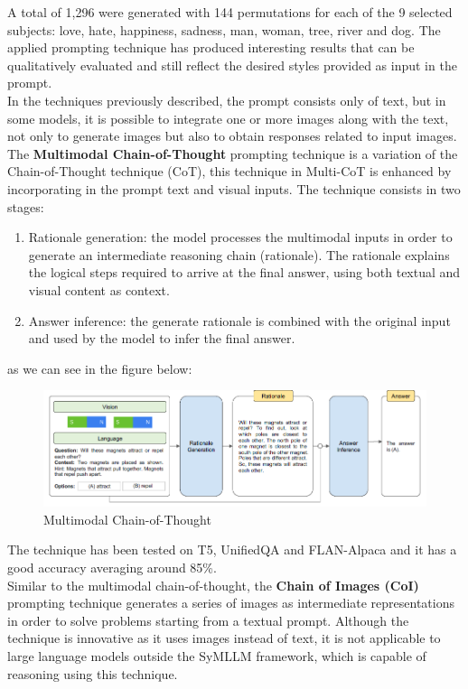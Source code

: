 A total of 1,296 were generated with 144 permutations for each of the 9 selected subjects: love, hate, happiness, sadness, man, woman, tree, river and dog. The applied prompting technique has produced interesting results that can be qualitatively evaluated and still reflect the desired styles provided as input in the prompt.\\
In the techniques previously described, the prompt consists only of text, but in some models, it is possible to integrate one or more images along with the text, not only to generate images but also to obtain responses related to input images. The \textbf{Multimodal Chain-of-Thought} prompting technique\cite{zhang2023multimodal} is a variation of the Chain-of-Thought technique (CoT), this technique in Multi-CoT is enhanced by incorporating in the prompt text and visual inputs. The technique consists in two stages:
\begin{enumerate}
    \item Rationale generation: the model processes the multimodal inputs in order to generate an intermediate reasoning chain (rationale). The rationale explains the logical steps required to arrive at the final answer, using both textual and visual content as context.

    \item Answer inference: the generate rationale is combined with the original input and used by the model to infer the final answer.
\end{enumerate}
as we can see in the figure below:
\begin{figure}[H]
    \centering
    \includegraphics[width=0.9\linewidth]{Figures/fig_16.png}
    \caption{Multimodal Chain-of-Thought}
    \label{fig:enter-label}
\end{figure}
The technique has been tested on T5, UnifiedQA and FLAN-Alpaca and it has a good accuracy averaging around 85\%.\\
Similar to the multimodal chain-of-thought, the \textbf{Chain of Images (CoI)} prompting technique \cite{meng2023chain} generates a series of images as intermediate representations in order to solve problems starting from a textual prompt. Although the technique is innovative as it uses images instead of text, it is not applicable to large language models outside the SyMLLM framework, which is capable of reasoning using this technique. \\\\